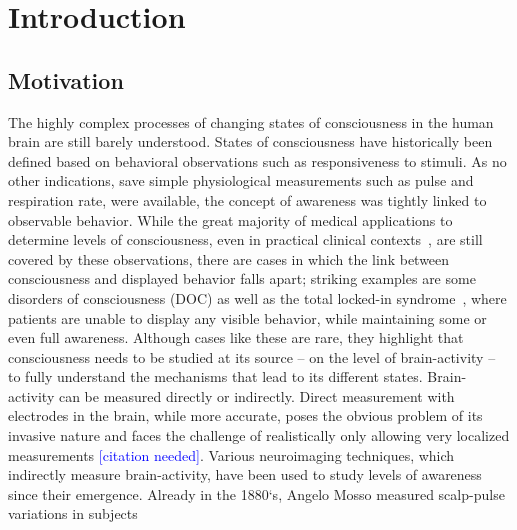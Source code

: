 \chapter{Introduction}\label{ch:introduction}





\section{Motivation}\label{sec:motivation}
The highly complex processes of changing states of consciousness in the human brain are still barely understood.
States of consciousness have historically been defined based on behavioral observations such as responsiveness to
stimuli.
As no other indications, save simple physiological measurements such as pulse and respiration rate,
were available, the concept of awareness was tightly linked to observable behavior.
While the great majority of medical applications to determine levels of consciousness,
even in practical clinical contexts~\cite{jain_glasgow_2022},
are still covered by these observations,
there are cases in which the link between consciousness and displayed behavior falls apart;
striking examples are some disorders of consciousness (DOC) as well as the total locked-in
syndrome~\cite{bauer_varieties_1979},
where patients are unable to display any visible behavior,
while maintaining some or even full awareness.
Although cases like these are rare, they highlight that consciousness needs to be studied at its source -- on the
level of brain-activity -- to fully understand the mechanisms that lead to its different states.
%
%
Brain-activity can be measured directly or indirectly.
Direct measurement with electrodes in the brain, while more accurate,
poses the obvious problem of its invasive nature and faces the challenge of realistically only allowing very
localized measurements \textcolor{blue}{[citation needed]}.
Various neuroimaging techniques, which indirectly measure brain-activity, have been used to study levels of
awareness since their emergence.
Already in the 1880`s, Angelo Mosso measured scalp-pulse variations in subjects
